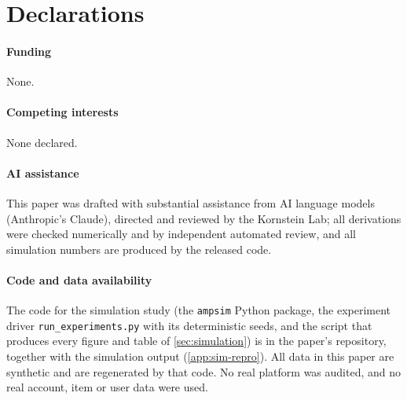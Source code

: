 \documentclass[11pt]{article}
\begin{document}

\section*{Declarations}
\paragraph{Funding} None.
\paragraph{Competing interests} None declared.
\paragraph{AI assistance} This paper was drafted with substantial assistance
from AI language models (Anthropic's Claude), directed and reviewed by the
Kornstein Lab; all derivations were checked numerically and by independent
automated review, and all simulation numbers are produced by the released
code.
\paragraph{Code and data availability} The code for the simulation study (the
\texttt{ampsim} Python package, the experiment driver
\texttt{run\_experiments.py} with its deterministic seeds, and the script that
produces every figure and table of \cref{sec:simulation}) is in the paper's
repository, together with the simulation output (\cref{app:sim-repro}). All
data in this paper are synthetic and are regenerated by that code. No real
platform was audited, and no real account, item or user data were used.
\end{document}
